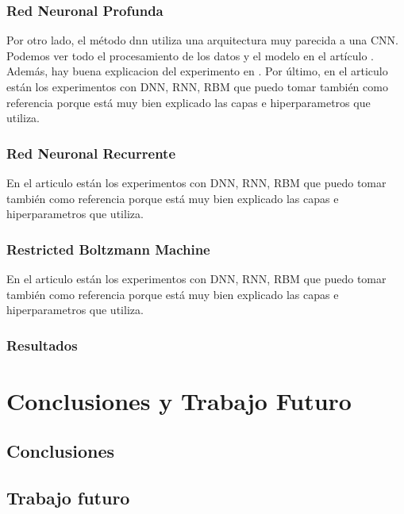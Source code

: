 \documentclass[12pt,a4paper]{book}
\begin{document}
\subsection{Red Neuronal Profunda}
Por otro lado, el método \gls{dnn} utiliza una arquitectura muy parecida a una CNN. Podemos ver todo el procesamiento de los datos y el modelo en el artículo \citep{maithem2021network}. Además, hay buena explicacion del experimento en \citep{vigneswaran2018evaluating}. Por último, en el articulo \citep{elmasry2019empirical} están los experimentos con DNN, RNN,  RBM que puedo tomar también como referencia porque está muy bien explicado las capas e hiperparametros que utiliza.

\subsection{Red Neuronal Recurrente}
En el articulo \citep{elmasry2019empirical} están los experimentos con DNN, RNN,  RBM que puedo tomar también como referencia porque está muy bien explicado las capas e hiperparametros que utiliza.

\subsection{Restricted Boltzmann Machine}
En el articulo \citep{elmasry2019empirical} están los experimentos con DNN, RNN,  RBM que puedo tomar también como referencia porque está muy bien explicado las capas e hiperparametros que utiliza.


\subsection{Resultados}


\chapter{Conclusiones y Trabajo Futuro} \label{Capítulo 6}



\section{Conclusiones} \label{Subsec: 6_1}



\section{Trabajo futuro} \label{Subsec: 6_2}
















  
\newpage

\medskip
\nocite{*}


\clearpage

\newpage

\appendix

\printglossary
\end{document}
